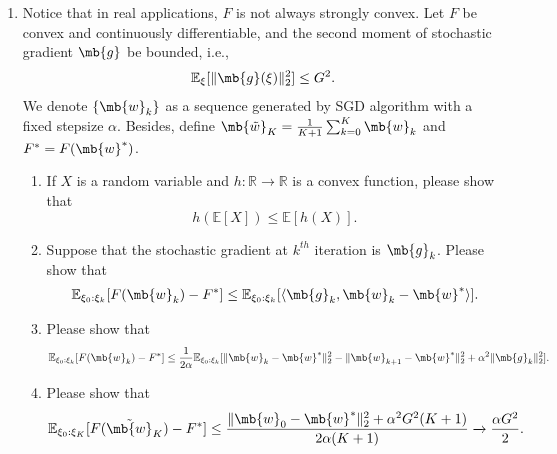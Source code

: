 \begin{exercise}
\begin{enumerate}
        \item Notice that in real applications, $F$ is not always strongly convex. Let $F$ be convex and continuously  differentiable, and the second moment of stochastic gradient $ \mb{g} $ be bounded, i.e.,
            \begin{align*}
                \mathbb{E}_{\xi}[\|\mb{g}(\xi)\|_2^2]\leq G^2.
            \end{align*}
            We denote $\{\mb{w}_k\}$ as a sequence generated by SGD algorithm with a fixed stepsize $\alpha$. Besides, define
            $ \mb{\tilde{w}}_K=\frac{1}{K+1}\sum_{k=0}^{K} \mb{w}_k $ and $ F^*=F(\mb{w}^*) $.
            \begin{enumerate}
                \item If $X$ is a random variable and $h:\mathbb{R}\rightarrow\mathbb{R}$ is a convex function, please show that
                    $$h(\mathbb{E}[X]) \leq \mathbb{E}[h(X)].$$
                \item Suppose that the stochastic gradient at $ k^{th} $ iteration is $ \mb{g}_k $.  Please show that
                    \begin{align*}
                        \mathbb{E}_{\xi_0:\xi_{k}}[F(\mb{w}_{k})-F^*]\leq\mathbb{E}_{\xi_0:\xi_{k}}[\langle{\mb{g}_k, \mb{w}_{k}-\mb{w}^*}\rangle].
                    \end{align*}
                \item Please show that
                    \begin{align*}
                        \mathbb{E}_{\xi_0:\xi_{k}}[F(\mb{w}_k)-F^*]\leq\frac{1}{2\alpha}\mathbb{E}_{\xi_0:\xi_{k}}[\|\mb{w}_k-\mb{w}^*\|_2^2 - \|\mb{w}_{k+1}-\mb{w}^*\|_2^2 + \alpha^2 \|\mb{g}_k\|_2^2].
                    \end{align*}
                \item Please show that
                    \begin{align*}
                        \mathbb{E}_{\xi_0:\xi_K}[F(\tilde{\mb{w}}_K)-F^*] & \leq \frac{\|\mb{w}_0-\mb{w}^*\|_2^2 + \alpha^2 G^2 (K+1)}{2\alpha (K+1)}\xrightarrow[]{}\frac{\alpha G^2}{2}.
                    \end{align*}
            \end{enumerate}


\end{enumerate}
\end{exercise}
